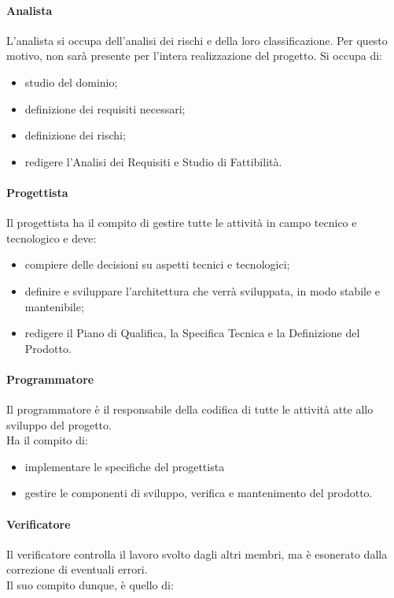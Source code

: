 		\paragraph{Analista}
		L'analista si occupa dell'analisi dei rischi e della loro classificazione. Per questo motivo, non sarà presente per l'intera realizzazione del progetto.
		Si occupa di:
		\begin{itemize}
			\item studio del dominio;
			\item definizione dei requisiti necessari;
			\item definizione dei rischi;
			\item redigere l'Analisi dei Requisiti e Studio di Fattibilità.
		\end{itemize}
		
		\paragraph{Progettista}
		Il progettista ha il compito di gestire tutte le attività in campo tecnico e tecnologico e deve:
		\begin{itemize}
			\item compiere delle decisioni su aspetti tecnici e tecnologici;
			\item definire e sviluppare l'architettura che verrà sviluppata, in modo stabile e mantenibile;
			\item redigere il Piano di Qualifica, la Specifica Tecnica e la Definizione del Prodotto.	
		\end{itemize}

		\paragraph{Programmatore}
		Il programmatore è il responsabile della codifica di tutte le attività atte allo sviluppo del progetto. \\
		Ha il compito di:
		\begin{itemize}
			\item implementare le specifiche del progettista 
			\item gestire le componenti di sviluppo, verifica e mantenimento del prodotto.
		\end{itemize}
			
		\paragraph{Verificatore}
		Il verificatore controlla il lavoro svolto dagli altri membri, ma è esonerato dalla correzione di eventuali errori. \\
		Il suo compito dunque, è quello di:
		
